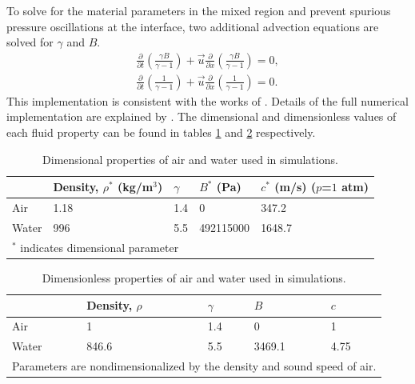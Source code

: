 To solve for
the material parameters in the mixed region and prevent spurious
pressure oscillations at the interface, two additional advection
equations are solved for $\gamma$ and $B$.
\begin{subequations} \label{usbe_lung_eosvar_advection}%
  \begin{align}%
    \frac{\partial}{\partial t}\left(\frac{\gamma B}{\gamma-1}\right)+\vec{u}\frac{\partial}{\partial x}\left(\frac{\gamma B}{\gamma-1}\right) = 0,\\
    \frac{\partial}{\partial t}\left(\frac{1}{\gamma-1}\right)+\vec{u}\frac{\partial}{\partial x}\left(\frac{1}{\gamma-1}\right) = 0. 
  \end{align}%
\end{subequations}%
This implementation is consistent with the works of \cite{Abgrall1996,
  Shyue2001, Beig2015}. Details of the full numerical implementation
are explained by \cite{HenrydeFrahan2015}.
%
The dimensional and dimensionless values of each fluid property can be
found in tables \ref{tab:usbe_lung_dimensional_parameters} and
\ref{tab:usbe_lung_dimensionless_parameters} respectively.
% 
\begin{table}[bp]%
  \begin{center}
    \caption{Dimensional properties of air and water used in simulations.}
    \label{tab:usbe_lung_dimensional_parameters}%
    \begin{tabularx}{0.75\textwidth}{| X | X | X | X | X |}
      \hline
      & Density, $\rho^*$ (kg/m$^3$) & $\gamma$ & $B^*$ (Pa)  & $c^*$ (m/s) ($p$=$1$ atm) \\ \hline
      Air   & 1.18                        & 1.4      & 0         & 347.2     \\ \hline
      Water & 996                           & 5.5      & 492115000 & 1648.7     \\ \hline
      \multicolumn{5}{l}{\small $^*$ indicates dimensional parameter}
    \end{tabularx}
  \end{center}
\end{table}%
\begin{table}[bp]%
  \begin{center}
    \caption{Dimensionless properties of air and water used in simulations.}
    \label{tab:usbe_lung_dimensionless_parameters}%
    \begin{tabularx}{0.75\textwidth}{| X | X | X | X | X |}
      \hline
      & Density, $\rho$ & $\gamma$ & $B$ & $c$ \\ \hline
      Air   & 1                          & 1.4      & 0         & 1          \\ \hline
      Water & 846.6                      & 5.5      & 3469.1    & 4.75       \\ \hline
      \multicolumn{5}{l}{\small Parameters are nondimensionalized by the density and sound speed of air. }
    \end{tabularx}
  \end{center}
\end{table}
% 
